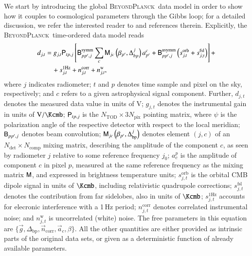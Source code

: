 \documentclass[twocolumn]{aa}
\newcommand{\n}[0]{\vec{n}}
\renewcommand{\a}[0]{\vec{a}}
\newcommand{\B}[0]{\tens{B}}
\newcommand{\g}[0]{\vec{g}}
\newcommand{\M}[0]{\tens{M}}
\renewcommand{\P}[0]{\tens{P}}
\newcommand{\BP}{\textsc{BeyondPlanck}}
\begin{document}
We start by introducing the global \BP\ data model in order to
show how it couples to cosmological parameters through the Gibbs loop;
for a detailed discussion, we refer the interested reader to
\citet{bp01} and references therein. Explicitly, the \BP\ time-ordered
data model reads
\begin{equation}
  \label{eq:data_model}
  \begin{split}
  d_{j,t} &= g_{j,t}{\P}_{tp,j}\left[ {\B}_{pp',j}^{\mathrm{symm}} \sum_c 
  {\M}_{jc}\left(\beta_{p'},\Delta_{bp}^j\right) a_{p'}^c +{\B}_{pp',j}^{\mathrm{asymm}}
  \left(s_{j,t}^{\mathrm{orb}}+s_{j,y}^{\mathrm{fsl}}\right)\right] + \\
  & \quad + s_{j,t}^{\mathrm{1Hz}} + n_{j,t}^{\mathrm{corr}}+n_{j,t}^{\mathrm{w}},
  \end{split}
\end{equation}
where $j$ indicates radiometer; $t$ and $p$ denotes time sample and
pixel on the sky, respectively; and $c$ refers to a given
astrophysical signal component. Further, $d_{j,t}$ denotes the
measured data value in units of $\si{\volt}$; $g_{j,t}$ denotes the
instrumental gain in units of $\si{\volt\per\Kcmb}$; $\P_{tp,j}$ is
the $N_{\mathrm{TOD}}\times 3N_{\mathrm{pix}}$ pointing matrix, where
$\psi$ is the polarization angle of the respective detector with
respect to the local meridian; $\B_{pp',j}$ denotes beam convolution;
$\M_{jc}\left(\beta_{p'},\Delta_{\mathrm{bp}}^j\right)$ denotes
element $(j,c)$ of an $N_{\mathrm{det}}\times N_{\mathrm{comp}}$
mixing matrix, describing the amplitude of the component $c$, as seen
by radiometer $j$ relative to some reference frequency $j_0$; $a_c^p$
is the amplitude of component $c$ in pixel $p$, measured at the same
reference frequency as the mixing matrix $\M$, and expressed in
brightness temperature units; $s_{j,t}^{\mathrm{orb}}$ is the orbital
CMB dipole signal in units of $\si{\Kcmb}$, including relativistic
quadrupole corrections; $s_{j,t}^{\mathrm{fsl}}$ denotes the
contribution from far sidelobes, also in units of $\si{\Kcmb}$;
$s_{j,t}^{\mathrm{1Hz}}$ accounts for elecronic interference with a
1\,Hz period; $n_{j,t}^{\mathrm{corr}}$ denotes correlated
instrumental noise; and $n_{j,t}^{\mathrm{w}}$ is uncorrelated (white)
noise. The free parameters in this equation are
$\lbrace\g,\Delta_{\mathrm{bp}},\n_{\mathrm{corr}},\a_c,\beta\rbrace$. All
the other quantities are either provided as intrinsic parts of the
original data sets, or given as a deterministic function of already
available parameters.
\end{document}
